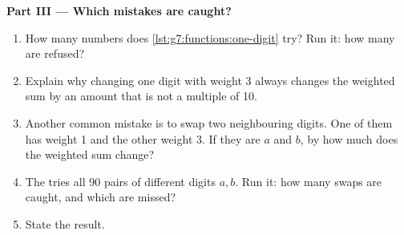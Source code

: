 \begin{problem}
\medskip\noindent\textbf{Part III --- Which mistakes are caught?}

\label{lst:g7:functions:one-digit}

\begin{enumerate}[resume]
  \item How many numbers does \cref{lst:g7:functions:one-digit} try? Run it:
    how many are refused?
  \item Explain why changing one digit with weight 3 always changes the
    weighted sum by an amount that is not a multiple of 10.
  \item Another common mistake is to swap two neighbouring digits. One of them
    has weight 1 and the other weight 3. If they are $a$ and $b$, by how much
    does the weighted sum change?
  \item The   tries all 90 pairs of different digits $a,
    b$. Run it: how many swaps are caught, and which are missed?

\label{lst:g7:functions:swaps}

  \item State the result.
\end{enumerate}
\end{problem}
